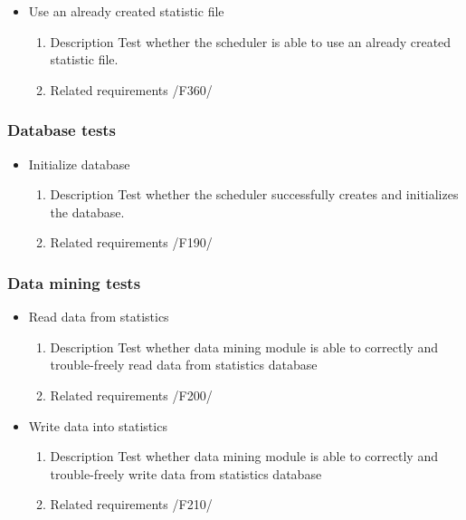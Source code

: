 {\begin{itemize}
			
			
				\item Use an already created statistic file
				\begin{enumerate}
					\item Description\newline
Test whether the scheduler is able to use an already created statistic file.
					\item Related requirements\newline
						/F360/
				\end{enumerate}
								
			\end{itemize}
		
		\subsubsection{Database tests}
			\begin{itemize}
				
		
				\item Initialize database
				\begin{enumerate}
					\item Description\newline
Test whether the scheduler successfully creates and initializes the database.
					\item Related requirements\newline
					/F190/
				\end{enumerate}
			\end{itemize}
		
		\subsubsection{Data mining tests}
			\begin{itemize}
			
				\item Read data from statistics
				\begin{enumerate}
					\item Description\newline
Test whether data mining module is able to correctly and trouble-freely read data from statistics database
					\item Related requirements\newline
					/F200/
				\end{enumerate}
				
				\item Write data into statistics
				\begin{enumerate}
					\item Description\newline
Test whether data mining module is able to correctly and trouble-freely write data from statistics database
					\item Related requirements\newline
					/F210/
				\end{enumerate}
				

\end{itemize}}
